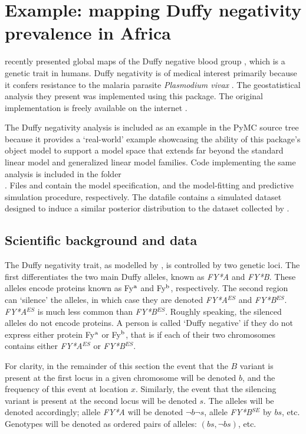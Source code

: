 \documentclass[article]{jss}
\begin{document}
\section{Example: mapping Duffy negativity prevalence in Africa}
\label{sec:duffy} 

\cite{Howes} recently presented global maps of the Duffy negative blood group \cite{duffy-cite}, which is a genetic trait in humans. Duffy negativity is of medical interest primarily because it confers resistance to the malaria parasite \emph{Plasmodium vivax} \cite{duffy-vivax-cite}. The geostatistical analysis they present was implemented using this package. The original implementation is freely available on the internet \citep{duffy-code, generic-mbg}. 

The Duffy negativity analysis is included as an example in the PyMC source tree because it provides a `real-world' example showcasing the ability of this package's object model to support a model space that extends far beyond the standard linear model and generalized linear model families. Code implementing the same analysis is included in the folder \\. Files  and  contain the model specification, and the model-fitting and predictive simulation procedure, respectively. The datafile  contains a simulated dataset designed to induce a similar posterior distribution to the dataset collected by \cite{Howes}. 

\subsection{Scientific background and data}
\label{subsec:duffy-data} 
The Duffy negativity trait, as modelled by \cite{Howes}, is controlled by two genetic loci. The first differentiates the two main Duffy alleles, known as \emph{FY*A} and \emph{FY*B}. These alleles encode proteins known as Fy$^\textup{a}$ and Fy$^\textup{b}$, respectively. The second region can `silence' the alleles, in which case they are denoted \emph{FY*A}$^{ES}$ and \emph{FY*B}$^{ES}$. \emph{FY*A}$^{ES}$ is much less common than \emph{FY*B}$^{ES}$. Roughly speaking, the silenced alleles do not encode proteins. A person is called `Duffy negative' if they do not express either protein Fy$^\textup{a}$ or Fy$^\textup{b}$, that is if each of their two chromosomes contains either \emph{FY*A}$^{ES}$ or \emph{FY*B}$^{ES}$. 

For clarity, in the remainder of this section the event that the $B$ variant is present at the first locus in a given chromosome will be denoted $b$, and the frequency of this event at location $x$. Similarly, the event that the silencing variant is present at the second locus will be denoted $s$. The alleles will be denoted accordingly; allele \emph{FY*A} will be denoted $\neg b \neg s$, allele \emph{FY*B}$^{SE}$ by $bs$, etc. Genotypes will be denoted as ordered pairs of alleles: $(bs,\neg b s)$, etc.
\end{document}

